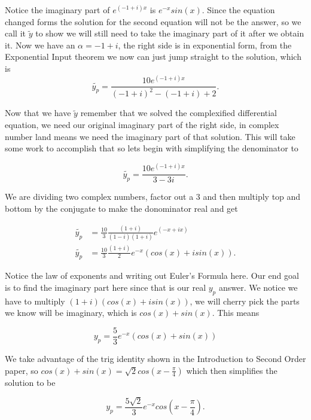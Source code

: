 \documentclass[12pt]{article}
\begin{document}
Notice the imaginary part of $e^{(-1+i)x}$ is $e^{-x}sin(x)$. Since the equation changed forms the solution for the second equation will not be the answer, so we call it $\tilde{y}$ to show we will still need to take the imaginary part of it after we obtain it. Now we have an $\alpha =-1+i$, the right side is in exponential form, from the Exponential Input theorem we now can just jump straight to the solution, which is 
\begin{equation*}
    \tilde{y_p}=\frac{10e^{(-1+i)x}}{(-1+i)^2-(-1+i)+2}.
\end{equation*}

Now that we have $\tilde{y}$ remember that we solved the complexified differential equation, we need our original imaginary part of the right side, in complex number land means we need the imaginary part of that solution. This will take some work to accomplish that so lets begin with simplifying the denominator to

\begin{equation*}
    \tilde{y_p}=\frac{10e^{(-1+i)x}}{3-3i}.
\end{equation*}

We are dividing two complex numbers, factor out a $3$ and then multiply top and bottom by the conjugate to make the donominator real and get

\begin{align*}
    \tilde{y_p} &=\frac{10}{3}\frac{(1+i)}{(1-i)(1+i)}e^{(-x+ix)} \\
    \tilde{y_p} &=\frac{10}{3}\frac{(1+i)}{2}e^{-x}(cos(x)+isin(x)).
\end{align*}

Notice the law of exponents and writing out Euler's Formula here. Our end goal is to find the imaginary part here since that is our real $y_p$ answer. We notice we have to multiply $(1+i)(cos(x)+isin(x))$, we will cherry pick the parts we know will be imaginary, which is $cos(x)+sin(x)$. This means

\begin{equation*}
    y_p = \frac{5}{3}e^{-x}(cos(x)+sin(x))
\end{equation*}

We take advantage of the trig identity shown in the Introduction to Second Order paper, so $cos(x)+sin(x)=\sqrt{2}cos(x-\frac{\pi}{4})$ which then simplifies the solution to be

\begin{equation*}
    y_p = \frac{5\sqrt{2}}{3}e^{-x}cos(x-\frac{\pi}{4}).
\end{equation*}
\end{document}
